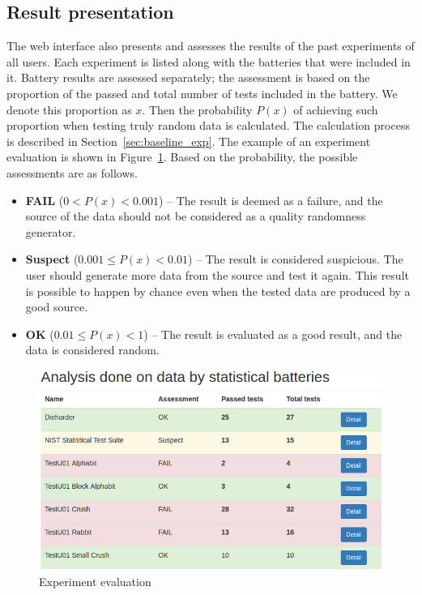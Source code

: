\documentclass[
	digital,    %
	oneside,    %
	color,
	11pt,
	nocover,
	notable,
	nolof,
	nolot,
]{fithesis3}
\theoremstyle{definition}
\theoremstyle{remark}
\begin{document}
\subsection*{Result presentation}
The web interface also presents and assesses the results of the past experiments of all users. Each experiment is listed along with the batteries that were included in it. Battery results are assessed separately; the assessment is based on the proportion of the passed and total number of tests included in the battery. We denote this proportion as $x$. Then the probability $P(x)$ of achieving such proportion when testing truly random data is calculated. The calculation process is described in Section~\ref{sec:baseline_exp}. The example of an experiment evaluation is shown in Figure~\ref{fig:rtt_assessment}. Based on the probability, the possible assessments are as follows.

\begin{itemize}
\item \textbf{FAIL} ($0 < P(x) < 0.001$) -- The result is deemed as a failure, and the source of the data should not be considered as a quality randomness generator.
\item \textbf{Suspect} ($0.001 \leq P(x) < 0.01$) -- The result is considered suspicious. The user should generate more data from the source and test it again. This result is possible to happen by chance even when the tested data are produced by a good source.
\item \textbf{OK} ($0.01 \leq P(x) < 1$) -- The result is evaluated as a good result, and the data is considered random.
\end{itemize}

\begin{figure}[H]
\begin{nomar}
\centering
\includegraphics[width=\textwidth]{figures/rtt-assessment.png} 
\end{nomar}
\caption{Experiment evaluation}
\label{fig:rtt_assessment}
\end{figure}
\end{document}
